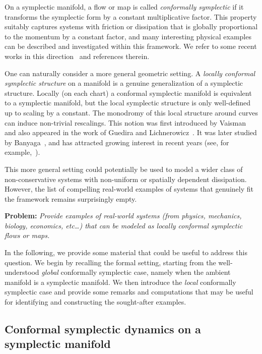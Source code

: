 \documentclass[11pt]{article}
\theoremstyle{definition}
\begin{document}
On a symplectic manifold, a flow or map is called {\it conformally symplectic} if it transforms the symplectic form by a constant multiplicative factor. This property suitably captures systems with friction or dissipation that is globally proportional to the momentum by a constant factor, and many interesting physical examples can be described and investigated within this framework. We refer to some recent works in this direction~\cite{AllaisArnaud, ArnaudFejoz, CCD, CCD2, MS} and references therein.

One can naturally consider a more general geometric setting. A \emph{locally conformal symplectic structure} on a manifold is a genuine generalization of a symplectic structure. Locally (on each chart) a conformal symplectic manifold is equivalent to a symplectic manifold, but the local symplectic structure is only well-defined up to scaling by a constant. The monodromy of this local structure around curves can induce non-trivial rescalings. This notion was first introduced by Vaisman~\cite{Vaisman, Vaisman2} and also appeared in the work of Guedira and Lichnerowicz~\cite{GL}. It was later studied by Banyaga~\cite{Banyaga}, and has attracted growing interest in recent years (see, for example,~\cite{CM}).

This more general setting could potentially be used to model a wider class of non-conservative systems with non-uniform or spatially dependent dissipation. However, the list of compelling real-world examples of systems that genuinely fit the framework remains surprisingly empty.

\noindent
\textbf{Problem:} \textit{Provide examples of real-world systems (from physics, mechanics, biology, economics, etc\ldots) that can be modeled as locally conformal symplectic flows or maps.}

In the following, we provide some material that could be useful to address this question. We begin by recalling the formal setting, starting from the well-understood {\it global} conformally symplectic case, namely when the ambient manifold is a symplectic manifold. We then introduce the {\it local} conformally symplectic case and provide some remarks and computations that may be useful for identifying and constructing the sought-after examples.

\subsection{Conformal symplectic dynamics on a symplectic manifold}\label{sec1}
\end{document}
